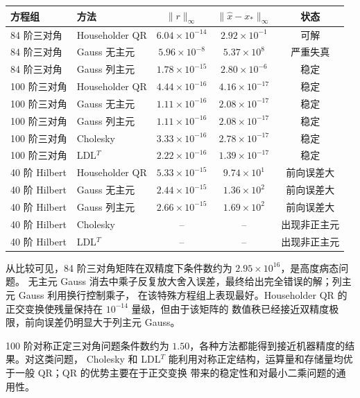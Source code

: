 \documentclass[a4paper,11pt]{article}
\begin{document}
\begin{table}[H]
\centering
\small
\begin{tabular}{llccc}
\toprule
方程组 & 方法 & $\|r\|_\infty$ & $\|\hat x-x_\ast\|_\infty$ & 状态 \\
\midrule
84 阶三对角 & Householder QR & $6.04\times10^{-14}$ & $2.92\times10^{-1}$ & 可解 \\
84 阶三对角 & Gauss 无主元 & $5.96\times10^{-8}$ & $5.37\times10^{8}$ & 严重失真 \\
84 阶三对角 & Gauss 列主元 & $1.78\times10^{-15}$ & $2.80\times10^{-6}$ & 稳定 \\
\midrule
100 阶三对角 & Householder QR & $4.44\times10^{-16}$ & $4.16\times10^{-17}$ & 稳定 \\
100 阶三对角 & Gauss 无主元 & $1.11\times10^{-16}$ & $2.08\times10^{-17}$ & 稳定 \\
100 阶三对角 & Gauss 列主元 & $1.11\times10^{-16}$ & $2.08\times10^{-17}$ & 稳定 \\
100 阶三对角 & Cholesky & $3.33\times10^{-16}$ & $2.78\times10^{-17}$ & 稳定 \\
100 阶三对角 & LDL$^T$ & $2.22\times10^{-16}$ & $1.39\times10^{-17}$ & 稳定 \\
\midrule
40 阶 Hilbert & Householder QR & $5.33\times10^{-15}$ & $9.74\times10^{1}$ & 前向误差大 \\
40 阶 Hilbert & Gauss 无主元 & $2.44\times10^{-15}$ & $1.36\times10^{2}$ & 前向误差大 \\
40 阶 Hilbert & Gauss 列主元 & $2.66\times10^{-15}$ & $1.69\times10^{2}$ & 前向误差大 \\
40 阶 Hilbert & Cholesky & -- & -- & 出现非正主元 \\
40 阶 Hilbert & LDL$^T$ & -- & -- & 出现非正主元 \\
\bottomrule
\end{tabular}
\end{table}

从比较可见，84 阶三对角矩阵在双精度下条件数约为 $2.95\times10^{16}$，是高度病态问题。
无主元 Gauss 消去中乘子反复放大舍入误差，最终给出完全错误的解；列主元 Gauss 利用换行控制乘子，
在该特殊方程组上表现最好。Householder QR 的正交变换使残量保持在 $10^{-14}$ 量级，但由于该矩阵的
数值秩已经接近双精度极限，前向误差仍明显大于列主元 Gauss。

100 阶对称正定三对角问题条件数约为 $1.50$，各种方法都能得到接近机器精度的结果。对这类问题，
Cholesky 和 LDL$^T$ 能利用对称正定结构，运算量和存储量均优于一般 QR；QR 的优势主要在于正交变换
带来的稳定性和对最小二乘问题的通用性。
\end{document}
